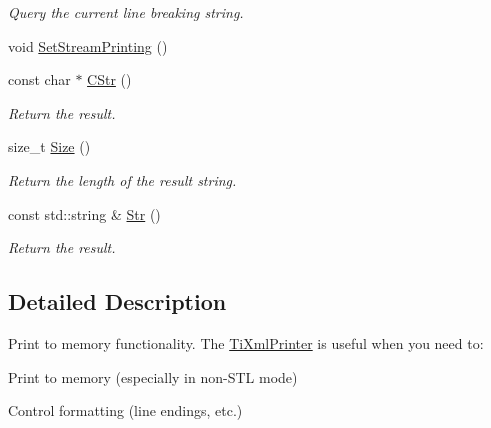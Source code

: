 \begin{DoxyCompactItemize}
\begin{DoxyCompactList}\small\item\em Query the current line breaking string. \item\end{DoxyCompactList}\item 
void \hyperlink{class_ti_xml_printer_ab23a90629e374cb1cadca090468bbd19}{SetStreamPrinting} ()
\item 
\hypertarget{class_ti_xml_printer_a859eede9597d3e0355b77757be48735e}{
const char $\ast$ \hyperlink{class_ti_xml_printer_a859eede9597d3e0355b77757be48735e}{CStr} ()}
\label{class_ti_xml_printer_a859eede9597d3e0355b77757be48735e}

\begin{DoxyCompactList}\small\item\em Return the result. \item\end{DoxyCompactList}\item 
\hypertarget{class_ti_xml_printer_ad01375ae9199bd2f48252eaddce3039d}{
size\_\-t \hyperlink{class_ti_xml_printer_ad01375ae9199bd2f48252eaddce3039d}{Size} ()}
\label{class_ti_xml_printer_ad01375ae9199bd2f48252eaddce3039d}

\begin{DoxyCompactList}\small\item\em Return the length of the result string. \item\end{DoxyCompactList}\item 
\hypertarget{class_ti_xml_printer_a3bd4daf44309b41f5813a833caa0d1c9}{
const std::string \& \hyperlink{class_ti_xml_printer_a3bd4daf44309b41f5813a833caa0d1c9}{Str} ()}
\label{class_ti_xml_printer_a3bd4daf44309b41f5813a833caa0d1c9}

\begin{DoxyCompactList}\small\item\em Return the result. \item\end{DoxyCompactList}\end{DoxyCompactItemize}


\subsection{Detailed Description}
Print to memory functionality. The \hyperlink{class_ti_xml_printer}{TiXmlPrinter} is useful when you need to:


\begin{DoxyEnumerate}
\item Print to memory (especially in non-\/STL mode)
\item Control formatting (line endings, etc.)
\end{DoxyEnumerate}

